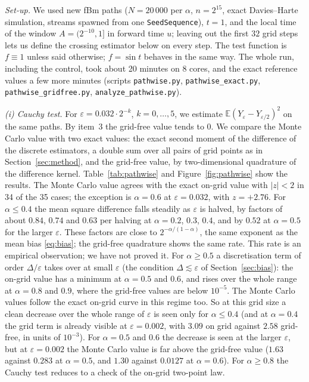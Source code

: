 \documentclass[11pt]{article}
\theoremstyle{remark}
\theoremstyle{definition}
\newcommand{\E}{\mathbb{E}}
\begin{document}
\emph{Set-up.} We used new fBm paths ($N=20\,000$ per $\alpha$, $n=2^{15}$, exact Davies--Harte simulation, streams spawned from one \texttt{SeedSequence}), $t=1$, and the local time of the window $A=(2^{-10},1]$ in forward time $u$; leaving out the first $32$ grid steps lets us define the crossing estimator below on every step. The test function is $f\equiv1$ unless said otherwise; $f=\sin t$ behaves in the same way. The whole run, including the control, took about 20 minutes on 8 cores, and the exact reference values a few more minutes (scripts \texttt{pathwise.py}, \texttt{pathwise\_exact.py}, \texttt{pathwise\_gridfree.py}, \texttt{analyze\_pathwise.py}).

\emph{(i) Cauchy test.} For $\varepsilon=0.032\cdot2^{-k}$, $k=0,\dots,5$, we estimate $\E(Y_\varepsilon-Y_{\varepsilon/2})^2$ on the same paths. By item~3 the grid-free value tends to $0$. We compare the Monte Carlo value with two exact values: the exact second moment of the difference of the discrete estimators, a double sum over all pairs of grid points as in Section~\ref{sec:method}, and the grid-free value, by two-dimensional quadrature of the difference kernel. Table~\ref{tab:pathwise} and Figure~\ref{fig:pathwise} show the results. The Monte Carlo value agrees with the exact on-grid value with $|z|<2$ in 34 of the 35 cases; the exception is $\alpha=0.6$ at $\varepsilon=0.032$, with $z=+2.76$. For $\alpha\le0.4$ the mean square difference falls steadily as $\varepsilon$ is halved, by factors of about $0.84$, $0.74$ and $0.63$ per halving at $\alpha=0.2$, $0.3$, $0.4$, and by $0.52$ at $\alpha=0.5$ for the larger $\varepsilon$. These factors are close to $2^{-\alpha/(1-\alpha)}$, the same exponent as the mean bias \eqref{eq:bias}; the grid-free quadrature shows the same rate. This rate is an empirical observation; we have not proved it. For $\alpha\ge0.5$ a discretisation term of order $\Delta/\varepsilon$ takes over at small $\varepsilon$ (the condition $\Delta\lesssim\varepsilon$ of Section~\ref{sec:bias}): the on-grid value has a minimum at $\alpha=0.5$ and $0.6$, and rises over the whole range at $\alpha=0.8$ and $0.9$, where the grid-free values are below $10^{-5}$. The Monte Carlo values follow the exact on-grid curve in this regime too. So at this grid size a clean decrease over the whole range of $\varepsilon$ is seen only for $\alpha\le0.4$ (and at $\alpha=0.4$ the grid term is already visible at $\varepsilon=0.002$, with $3.09$ on grid against $2.58$ grid-free, in units of $10^{-3}$). For $\alpha=0.5$ and $0.6$ the decrease is seen at the larger $\varepsilon$, but at $\varepsilon=0.002$ the Monte Carlo value is far above the grid-free value ($1.63$ against $0.283$ at $\alpha=0.5$, and $1.30$ against $0.0127$ at $\alpha=0.6$). For $\alpha\ge0.8$ the Cauchy test reduces to a check of the on-grid two-point law.
\end{document}
